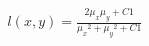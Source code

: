 \documentclass[preview]{standalone}
\begin{document}
\begin{align*}
l(x,y) = \frac{2\mu_x\mu_y + C1}{{\mu_x}^2 + {\mu_y}^2 + C1}
\end{align*}
\end{document}
